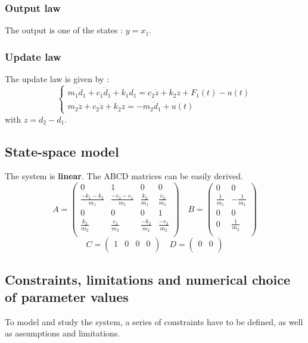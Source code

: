 \subsubsection{Output law}
The output is one of the states : $y = x_1$.

\subsubsection{Update law}
The update law is given by \cite{YANG201718} :
$$
\begin{cases}
    m_{1}\ddot{d}_{1} + c_{1}\dot{d}_{1} + k_{1}d_{1} = c_{2}\dot{z} + k_{2}z + F_{1}(t) - u(t)\\
    m_{2}\ddot{z} + c_{2}\dot{z} + k_{2}z = -m_{2}\ddot{d}_{1} + u(t)
\end{cases}
$$
with $z = d_2 - d_1$.

\subsection{State-space model}
The system is \textbf{linear}. The ABCD matrices can be easily derived.
$$
A = \begin{pmatrix}
    0 & 1 & 0 & 0 \\
    \frac{-k_1-k_2}{m_1} & \frac{-c_2-c_1}{m_1} & \frac{k_2}{m_1} & \frac{c_2}{m_1} \\
    0 & 0 & 0 & 1 \\ 
    \frac{k_2}{m_2} & \frac{c_2}{m_2} & \frac{-k_2}{m_2} & \frac{-c_2}{m_2}\\
\end{pmatrix}
\quad
B = \begin{pmatrix}
    0 & 0\\
    \frac{1}{m_1} & -\frac{1}{m_1}\\
    0 & 0\\
    0 & \frac{1}{m_2}\\
\end{pmatrix}
$$
$$
C = \begin{pmatrix}
    1 & 0 & 0 & 0\\
\end{pmatrix}
\quad
D = \begin{pmatrix}
    0 & 0\\
\end{pmatrix}
$$

\subsection{Constraints, limitations and numerical choice of parameter values}
To model and study the system, a series of constraints have to be defined, as well as assumptions and limitations.

